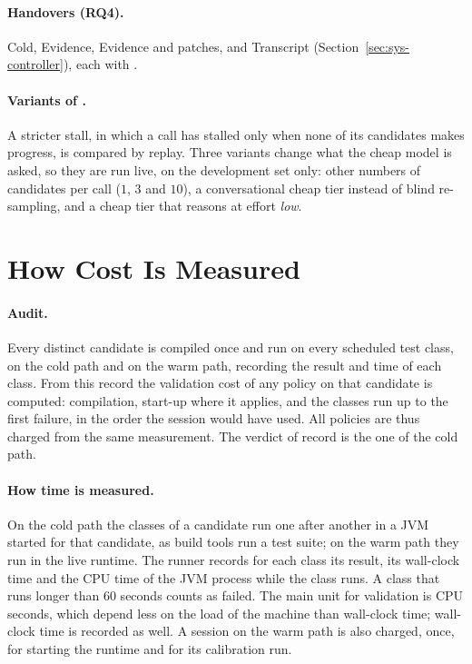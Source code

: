 \paragraph{Handovers (RQ4).} Cold, Evidence, Evidence and patches, and
Transcript (Section~\ref{sec:sys-controller}), each with \Step.

\paragraph{Variants of \Step.} A stricter stall, in which a call has stalled
only when none of its candidates makes progress, is compared by replay. Three
variants change what the cheap model is asked, so they are run live, on the
development set only: other numbers of candidates per call ($1$, $3$ and
$10$), a conversational cheap tier instead of blind re-sampling, and a cheap
tier that reasons at effort \emph{low}.

\section{How Cost Is Measured}
\label{sec:exp-measure}

\paragraph{Audit.} Every distinct candidate is compiled once and run on every
scheduled test class, on the cold path and on the warm path, recording the
result and time of each class. From this record the validation cost of any
policy on that candidate is computed: compilation, start-up where it applies,
and the classes run up to the first failure, in the order the session would
have used. All policies are thus charged from the same measurement. The
verdict of record is the one of the cold path.

\paragraph{How time is measured.} On the cold path the classes of a candidate
run one after another in a JVM started for that candidate, as build tools run
a test suite; on the warm path they run in the live runtime. The runner
records for each class its result, its wall-clock time and the CPU time of the
JVM process while the class runs. A class that runs longer than $60$ seconds
counts as failed. The main unit for validation is CPU seconds, which depend
less on the load of the machine than wall-clock time; wall-clock time is
recorded as well. A session on the warm path is also charged, once, for
starting the runtime and for its calibration run.

